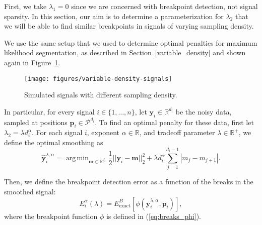 \documentclass{jsfds} %
\DeclareMathOperator*{\argmin}{arg\,min}
\newcommand{\RR}{\mathbb{R}}
\begin{document}
First, we take $\lambda_1=0$ since we are concerned with breakpoint
detection, not signal sparsity. In this section, our aim is to
determine a parameterization for $\lambda_2$ that we will be able to
find similar breakpoints in signals of varying sampling density.

We use the same setup that we used to determine optimal penalties for
maximum likelihood segmentation, as described in
Section~\ref{variable_density} and shown again in
Figure~\ref{fig:variable-density-signals-flsa}.

\begin{figure}[h]
  \centering
  \texttt{[image: figures/variable-density-signals]}
  \caption{Simulated signals with different
  sampling density.}
  \label{fig:variable-density-signals-flsa}
\end{figure}

\newpage

In particular, for every signal $i\in\{1,\dots,n\}$, let
$\mathbf y_i\in\RR^{d_i}$ be the noisy data, sampled at positions
$\mathbf p_i\in\mathcal P^{d_i}$. To find an optimal penalty for these data,
first let $\lambda_2 = \lambda d_i^\alpha$. For each signal $i$,
exponent $\alpha\in\RR$, and tradeoff parameter $\lambda\in\RR^+$, we
define the optimal smoothing as
\begin{equation}
  \label{eq:flsa_lambda}
  \mathbf{\hat y}^{\lambda,\alpha}_i = 
\argmin_{\mathbf m\in\RR^{d_i}} 
\frac 1 2 ||\mathbf y_i-\mathbf m||_2^2
+\lambda d_i^\alpha \sum_{j=1}^{d_i-1} |m_j - m_{j+1}|.
\end{equation}

Then, we define the breakpoint detection error as a function of the
breaks in the smoothed signal:
\begin{equation}
  \label{eq:flsa_e_i_alpha}
  E_i^\alpha(\lambda) = 
E^B_{\text{exact}}
\left[
\phi\left(
\mathbf{\hat y}^{\lambda,\alpha}_i, \mathbf p_i
\right)
\right],
\end{equation}
where the breakpoint function $\phi$ is defined in
(\ref{eq:breaks_phi}).
\end{document}
